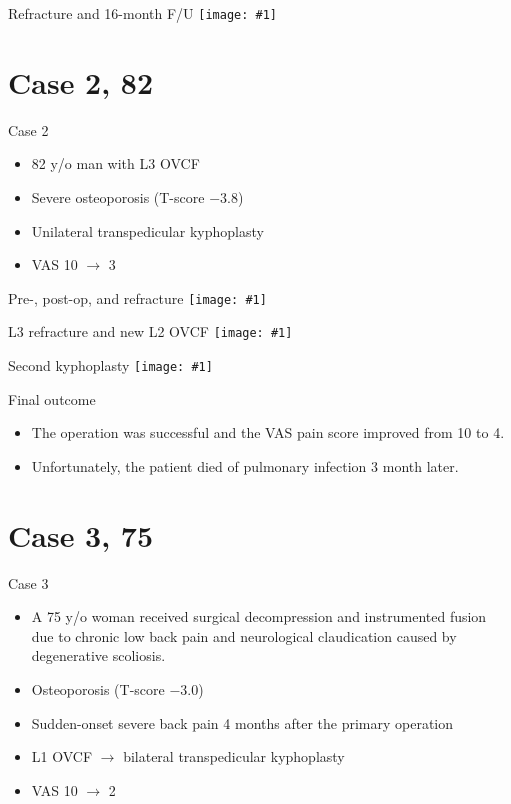 \documentclass{beamer}
\newcommand*{\solo}[1]{\centering\texttt{[image: \#1]}}
\begin{document}
\begin{frame}{Refracture and 16-month F/U}
    \solo{F1e.jpg}
\end{frame}

\section{Case 2, 82 \male}
\begin{frame}{Case 2}
    \begin{itemize}
        \item 82 y/o man with L3 OVCF
        \item Severe osteoporosis (T-score $-3.8$)
        \item Unilateral transpedicular kyphoplasty
        \item VAS 10 $\to$ 3
    \end{itemize}
\end{frame}

\begin{frame}{Pre-, post-op, and refracture}
    \solo{F2a.jpg}
\end{frame}

\begin{frame}{L3 refracture and new L2 OVCF}
    \solo{F2d.jpg}
\end{frame}

\begin{frame}{Second kyphoplasty}
    \solo{F2f.jpg}
\end{frame}

\begin{frame}{Final outcome}
    \begin{itemize}
        \item The operation was successful and the VAS pain score improved from 10 to 4.
        \item Unfortunately, the patient died of pulmonary infection 3 month later.
    \end{itemize}
\end{frame}

\section{Case 3, 75 \female}
\begin{frame}{Case 3}
    \begin{itemize}
        \item A 75 y/o woman received surgical decompression and instrumented
              fusion due to chronic low back pain and neurological claudication
              caused by degenerative scoliosis.
        \item Osteoporosis (T-score $-3.0$)
        \item Sudden-onset severe back pain 4 months after the primary operation
        \item L1 OVCF $\to$ bilateral transpedicular kyphoplasty
        \item VAS 10 $\to$ 2
    \end{itemize}
\end{frame}
\end{document}
